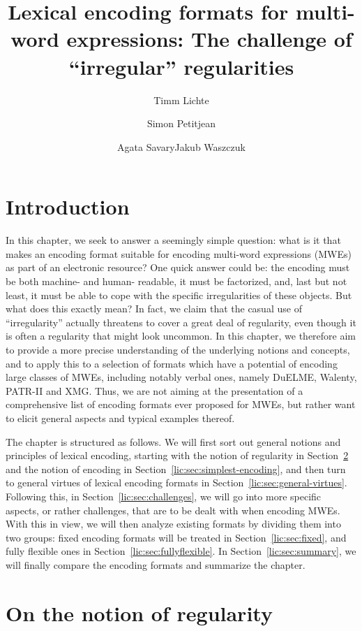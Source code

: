 \documentclass[output=paper
,modfonts
,nonflat
,biblatexbackend=biber
]{langsci/langscibook}
\author{Timm Lichte\affiliation{University of Düsseldorf}\and Simon Petitjean\affiliation{University of Düsseldorf}\and Agata Savary\affiliation{University of Tours}\lastand Jakub Waszczuk\affiliation{Université of Tours\\University of Orléans}}
\title{Lexical encoding formats for multi-word expressions: The challenge of ``irregular'' regularities}
\begin{document}
\maketitle


%
\section{Introduction}

In this chapter, we seek to answer a seemingly simple question: what is it that makes an encoding format suitable for encoding multi-word expressions (MWEs) as part of an electronic resource? One quick answer could be: the encoding must be both machine- and human- readable, it must be factorized, and, last but not least, it must be able to cope with the specific irregularities of these objects. But what does this exactly mean? In fact, we claim that the casual use of ``irregularity'' actually threatens to cover a great deal of regularity, even though it is often a regularity that might look uncommon. In this chapter, we therefore aim to provide a more precise understanding of the underlying notions and concepts, and to apply this to a selection of formats which have a potential of encoding large classes of MWEs, including notably verbal ones, namely DuELME, Walenty, PATR-II and XMG. Thus, we are not aiming at the presentation of a comprehensive list of encoding formats ever proposed for MWEs, but rather want to elicit general aspects and typical examples thereof. 

The chapter is structured as follows. We will first sort out general notions and principles of lexical encoding, starting with the notion of regularity in Section~\ref{lic:sec:notion-regularity} and the notion of encoding in Section~\ref{lic:sec:simplest-encoding}, and then turn to general virtues of lexical encoding formats in Section~\ref{lic:sec:general-virtues}. Following this, in Section~\ref{lic:sec:challenges}, we will go into more specific aspects, or rather challenges, that are to be dealt with when encoding MWEs. With this in view, we will then analyze existing formats by dividing them into two groups: fixed encoding formats will be treated in Section~\ref{lic:sec:fixed}, and fully flexible ones in Section~\ref{lic:sec:fullyflexible}. In Section~\ref{lic:sec:summary}, we will finally compare the encoding formats and summarize the chapter.

\section{ On the notion of regularity}
\label{lic:sec:notion-regularity}
\end{document}
